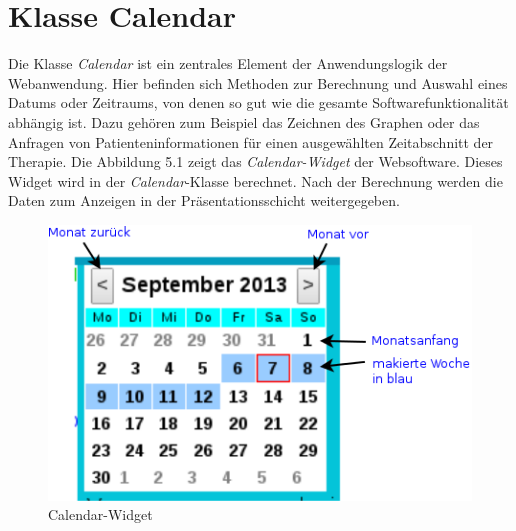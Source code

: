 

\section{Klasse Calendar} 

Die Klasse \emph{Calendar} ist ein zentrales Element der Anwendungslogik der Webanwendung.
Hier befinden sich Methoden zur Berechnung und Auswahl eines Datums oder Zeitraums,
von denen so gut wie die gesamte Softwarefunktionalit\"at abh\"angig ist.
Dazu geh\"oren zum Beispiel das Zeichnen des Graphen oder das Anfragen von Patienteninformationen 
f\"ur einen ausgew\"ahlten Zeitabschnitt der Therapie.
Die Abbildung 5.1 zeigt das \emph{Calendar-Widget} der Websoftware.
Dieses Widget wird in der \emph{Calendar}-Klasse berechnet.
Nach der Berechnung werden die Daten zum Anzeigen in der Pr\"asentationsschicht weitergegeben.\\

\begin{figure}[h]
  \centering
  \includegraphics[scale=0.7]{screenshots/kapitel5/calendar_widget_beschriftet.png}
  \caption{Calendar-Widget}
  
\end{figure}

